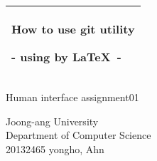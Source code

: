 %
%
%
%
%
\begin{titlepage}
  \addtolength{\hoffset}{0.5\evensidemargin-0.5\oddsidemargin} %
  \noindent%
  \begin{tabular}{@{}p{\textwidth}@{}}
    \toprule[2pt]
    \midrule
    \vspace{0.2cm}
    \begin{center}
    \Huge{\textbf{
      How to use git utility%
    }}
    \end{center}
    \begin{center}
      \Large{
        - using by \LaTeX\ -%
      }
    \end{center}
    \vspace{0.2cm}\\
    \midrule
    \toprule[2pt]
  \end{tabular}
  \vspace{4 cm}
  \begin{center}
    {\large
      Human interface assignment01%
    }\\
    \vspace{0.2cm}
  \end{center}
  \vfill
  \begin{center}
  Joong-ang University\\
  Department of Computer Science\\
  20132465 yongho, Ahn
  \end{center}
\end{titlepage}
